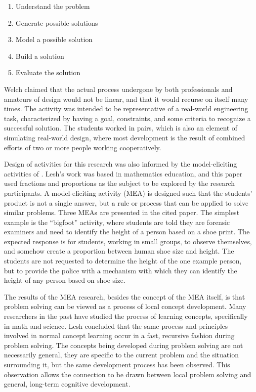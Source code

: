 \begin{enumerate}
\item Understand the problem
\item Generate possible solutions
\item Model a possible solution
\item Build a solution
\item Evaluate the solution
\end{enumerate}

Welch claimed that the actual process undergone by both professionals
and amateurs of design would not be linear, and that it would recurse
on itself many times. The activity was intended to be representative
of a real-world engineering task, characterized by having a goal,
constraints, and some criteria to recognize a successful solution.
The students worked in pairs, which is also an element of simulating
real-world design, where most development is the result of combined
efforts of two or more people working cooperatively.

Design of activities for this research was also informed by the
model-eliciting activities of \citet{lesh03}. Lesh's work was based in
mathematics education, and this paper used fractions and proportions as the subject
to be explored by the research participants. A model-eliciting activity (MEA) is \label{sec:MEA}
designed such that the students' product is not a single
answer, but a rule or process that can be applied to solve similar
problems. Three MEAs are presented in the cited paper. The simplest example
is the ``bigfoot'' activity, where students are told they are
forensic examiners and need to identify the height of a person based
on a shoe print. The expected response is for students, working in
small groups, to observe themselves, and somehow create a proportion
between human shoe size and height. The students are not requested
to determine the height of the one example person, but to provide
the police with a mechanism with which they can identify the height
of any person based on shoe size. 

The results of the MEA research, besides the concept of the MEA itself,
is that problem solving can be viewed as a process of local concept
development. Many researchers in the past have studied the process
of learning concepts, specifically in math and science. Lesh concluded
that the same process and principles involved in normal concept learning
occur in a fast, recursive fashion during problem solving. The concepts
being developed during problem solving are not necessarily general, they are specific
to the current problem and the situation surrounding it, but the same
development process has been observed. This observation allows the
connection to be drawn between local problem solving and general,
long-term cognitive development.

